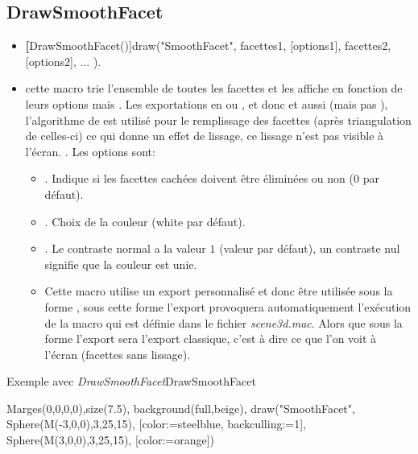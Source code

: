 \subsection{DrawSmoothFacet}\label{macDrawSmoothFacet}
\begin{itemize}
 \item \util \textbf[DrawSmoothFacet()]{draw("SmoothFacet", facettes1, [options1], facettes2, [options2], ... )}.
 \item \desc cette macro trie l'ensemble de toutes les facettes et les affiche en fonction de leurs options mais . Les exportations en  ou , et donc  et  aussi (mais pas ), l'algorithme de \Gouraud est utilisé pour le remplissage des facettes (après triangulation de celles-ci) ce qui donne un effet de lissage, ce lissage n'est pas visible à l'écran. . Les options sont:

  \begin{itemize}
  \item {}. Indique si les facettes cachées doivent être éliminées ou non (0 par défaut).
  \item {}. Choix de la couleur (white par défaut).
  \item {}. Le contraste normal a la valeur $1$ (valeur par défaut), un contraste nul signifie que la couleur est unie.
 \item Cette macro utilise un export personnalisé et donc être utilisée sous la forme , sous cette forme l'export provoquera automatiquement l'exécution de la macro  qui est définie dans le fichier \textit{scene3d.mac}. Alors que sous la forme  l'export sera l'export classique, c'est à dire ce que l'on voit à l'écran (facettes sans lissage).   \end{itemize}
\end{itemize}


\pngtrue
\begin{demo}{Exemple avec \textsl{DrawSmoothFacet}}{DrawSmoothFacet}
\begin{texgraph}[name=DrawSmoothFacet,
         export=eps]
Marges(0,0,0,0),size(7.5),
background(full,beige),
draw("SmoothFacet", Sphere(M(-3,0,0),3,25,15),
         [color:=steelblue,
          backculling:=1],
         Sphere(M(3,0,0),3,25,15),
         [color:=orange])
\end{texgraph}
\end{demo}
\pngfalse


